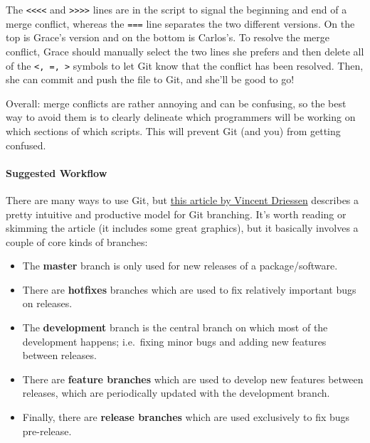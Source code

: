 \documentclass[
]{book}
\providecommand{\tightlist}{%
  \setlength{\itemsep}{0pt}\setlength{\parskip}{0pt}}
\begin{document}
The \texttt{\textless{}\textless{}\textless{}\textless{}} and \texttt{\textgreater{}\textgreater{}\textgreater{}\textgreater{}} lines are in the script to signal the beginning and end of a merge conflict, whereas the \texttt{===} line separates the two different versions. On the top is Grace's version and on the bottom is Carlos's. To resolve the merge conflict, Grace should manually select the two lines she prefers and then delete all of the \texttt{\textless{},\ =,\ \textgreater{}} symbols to let Git know that the conflict has been resolved. Then, she can commit and push the file to Git, and she'll be good to go!

Overall: merge conflicts are rather annoying and can be confusing, so the best way to avoid them is to clearly delineate which programmers will be working on which sections of which scripts. This will prevent Git (and you) from getting confused.

\hypertarget{suggested-workflow}{%
\paragraph{Suggested Workflow}\label{suggested-workflow}}

There are many ways to use Git, but \href{https://nvie.com/posts/a-successful-git-branching-model/}{this article by Vincent Driessen} describes a pretty intuitive and productive model for Git branching. It's worth reading or skimming the article (it includes some great graphics), but it basically involves a couple of core kinds of branches:

\begin{itemize}
\tightlist
\item
  The \textbf{master} branch is only used for new releases of a package/software.
\item
  There are \textbf{hotfixes} branches which are used to fix relatively important bugs on releases.
\item
  The \textbf{development} branch is the central branch on which most of the development happens; i.e.~fixing minor bugs and adding new features between releases.
\item
  There are \textbf{feature branches} which are used to develop new features between releases, which are periodically updated with the development branch.
\item
  Finally, there are \textbf{release branches} which are used exclusively to fix bugs pre-release.
\end{itemize}
\end{document}
